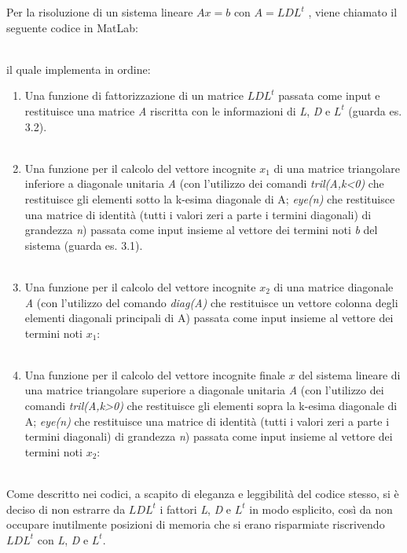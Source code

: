 Per la risoluzione di un sistema lineare $Ax=b$ con $A=LDL^t$ , viene chiamato il seguente codice in MatLab:\\\

il quale implementa in ordine:
\begin{enumerate}
\item
Una funzione di fattorizzazione di un matrice $LDL^t$ passata come input e restituisce una matrice \textit{A} riscritta con le informazioni di \textit{L}, \textit{D} e $L^t$ (guarda es. 3.2).\\\
\item
Una funzione per il calcolo del vettore incognite $x_1$ di una matrice triangolare inferiore a diagonale unitaria \textit{A} (con l'utilizzo dei comandi \textit{tril(A,k<0)} che restituisce gli elementi sotto la k-esima diagonale di A; \textit{eye(n)} che restituisce una matrice di identità (tutti i valori zeri a parte i termini diagonali) di grandezza \textit{n}) passata come input insieme al vettore dei termini noti \textit{b} del sistema (guarda es. 3.1). \\\
\item
Una funzione per il calcolo del vettore incognite $x_2$ di una matrice diagonale \textit{A} (con l'utilizzo del comando \textit{diag(A)} che restituisce un vettore colonna degli elementi diagonali principali di A) passata come input insieme al vettore dei termini noti $x_1$:\\\

\item
Una funzione per il calcolo del vettore incognite finale $x$ del sistema lineare di una matrice triangolare superiore a diagonale unitaria \textit{A} (con l'utilizzo dei comandi \textit{tril(A,k>0)} che restituisce gli elementi sopra la k-esima diagonale di A; \textit{eye(n)} che restituisce una matrice di identità (tutti i valori zeri a parte i termini diagonali) di grandezza \textit{n}) passata come input insieme al vettore dei termini noti $x_2$:\\\

\end{enumerate}
Come descritto nei codici, a scapito di eleganza e leggibilità del codice stesso, si è deciso di non estrarre da $LDL^t$ i fattori \textit{L}, \textit{D} e $L^t$ in modo esplicito, così da non occupare inutilmente posizioni di memoria che si erano risparmiate riscrivendo $LDL^t$ con \textit{L}, \textit{D} e $L^t$.